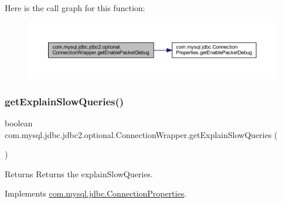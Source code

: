Here is the call graph for this function\+:
\nopagebreak
\begin{figure}[H]
\begin{center}
\leavevmode
\includegraphics[width=350pt]{classcom_1_1mysql_1_1jdbc_1_1jdbc2_1_1optional_1_1_connection_wrapper_a461ba0551d56c29d54b68ea0f12a875d_cgraph}
\end{center}
\end{figure}
\mbox{\label{classcom_1_1mysql_1_1jdbc_1_1jdbc2_1_1optional_1_1_connection_wrapper_adc6ad75acb4cedeadb60e9676687734e}} 
\subsubsection{\texorpdfstring{get\+Explain\+Slow\+Queries()}{getExplainSlowQueries()}}
{\footnotesize\ttfamily boolean com.\+mysql.\+jdbc.\+jdbc2.\+optional.\+Connection\+Wrapper.\+get\+Explain\+Slow\+Queries (\begin{DoxyParamCaption}{ }\end{DoxyParamCaption})}

\begin{DoxyReturn}{Returns}
Returns the explain\+Slow\+Queries. 
\end{DoxyReturn}


Implements \mbox{\hyperlink{interfacecom_1_1mysql_1_1jdbc_1_1_connection_properties_a51ec93b6fe482627e109814e0985c940}{com.\+mysql.\+jdbc.\+Connection\+Properties}}.

